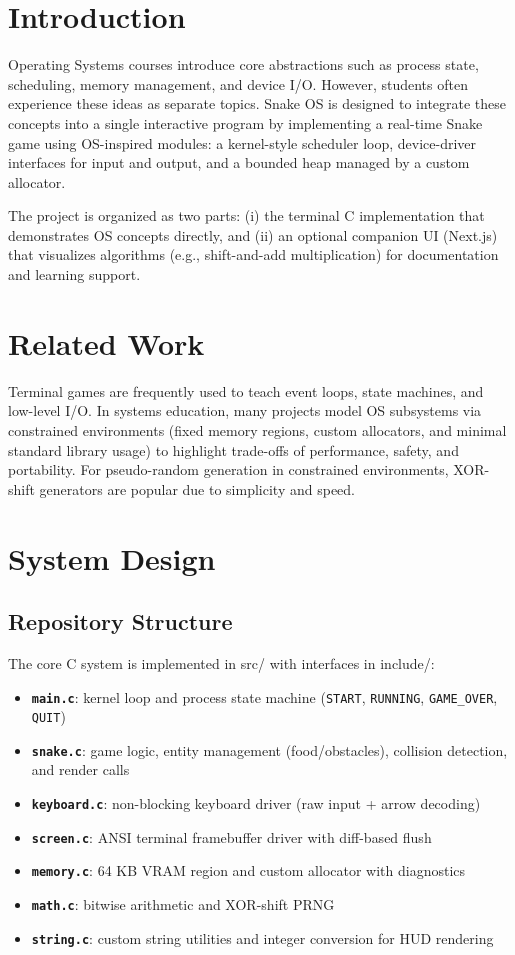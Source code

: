 \documentclass[conference]{IEEEtran}
\begin{document}
\section{Introduction}
Operating Systems courses introduce core abstractions such as process state, scheduling, memory management, and device I/O. However, students often experience these ideas as separate topics. Snake OS is designed to integrate these concepts into a single interactive program by implementing a real-time Snake game using OS-inspired modules: a kernel-style scheduler loop, device-driver interfaces for input and output, and a bounded heap managed by a custom allocator.

The project is organized as two parts: (i) the terminal C implementation that demonstrates OS concepts directly, and (ii) an optional companion UI (Next.js) that visualizes algorithms (e.g., shift-and-add multiplication) for documentation and learning support.

\section{Related Work}
Terminal games are frequently used to teach event loops, state machines, and low-level I/O. In systems education, many projects model OS subsystems via constrained environments (fixed memory regions, custom allocators, and minimal standard library usage) to highlight trade-offs of performance, safety, and portability. For pseudo-random generation in constrained environments, XOR-shift generators are popular due to simplicity and speed.

\section{System Design}
\subsection{Repository Structure}
The core C system is implemented in src/ with interfaces in include/:
\begin{itemize}
    \item \textbf{\texttt{main.c}}: kernel loop and process state machine (\texttt{START}, \texttt{RUNNING}, \texttt{GAME\_OVER}, \texttt{QUIT})
    \item \textbf{\texttt{snake.c}}: game logic, entity management (food/obstacles), collision detection, and render calls
    \item \textbf{\texttt{keyboard.c}}: non-blocking keyboard driver (raw input + arrow decoding)
    \item \textbf{\texttt{screen.c}}: ANSI terminal framebuffer driver with diff-based flush
    \item \textbf{\texttt{memory.c}}: 64 KB VRAM region and custom allocator with diagnostics
    \item \textbf{\texttt{math.c}}: bitwise arithmetic and XOR-shift PRNG
    \item \textbf{\texttt{string.c}}: custom string utilities and integer conversion for HUD rendering
\end{itemize}
\end{document}
